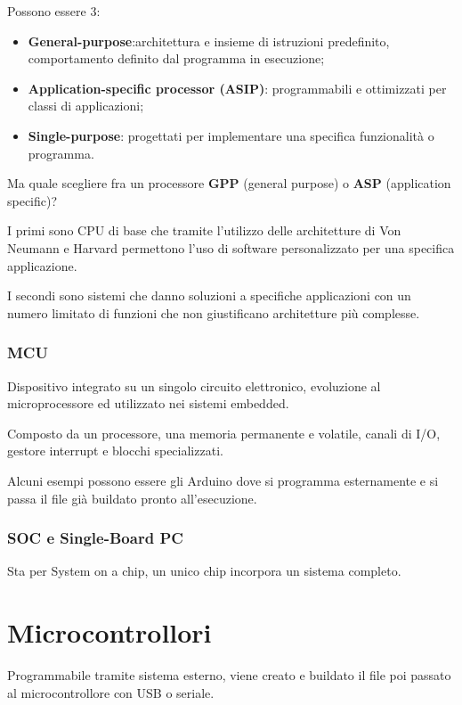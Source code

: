 Possono essere 3:

\begin{itemize}
\item
  \textbf{General-purpose}:architettura e insieme di istruzioni
  predefinito, comportamento definito dal programma in esecuzione;
\item
  \textbf{Application-specific processor (ASIP)}: programmabili e
  ottimizzati per classi di applicazioni;
\item
  \textbf{Single-purpose}: progettati per implementare una specifica
  funzionalità o programma.
\end{itemize}

Ma quale scegliere fra un processore \textbf{GPP} (general purpose) o
\textbf{ASP} (application specific)?

I primi sono CPU di base che tramite l'utilizzo delle architetture di
Von Neumann e Harvard permettono l'uso di software personalizzato per
una specifica applicazione.

I secondi sono sistemi che danno soluzioni a specifiche applicazioni con
un numero limitato di funzioni che non giustificano architetture più
complesse.

\subsubsection{MCU}\label{mcu}

Dispositivo integrato su un singolo circuito elettronico, evoluzione al
microprocessore ed utilizzato nei sistemi embedded.

Composto da un processore, una memoria permanente e volatile, canali di
I/O, gestore interrupt e blocchi specializzati.

Alcuni esempi possono essere gli Arduino dove si programma esternamente
e si passa il file già buildato pronto all'esecuzione.

\subsubsection{SOC e Single-Board PC}\label{soc-e-single-board-pc}

Sta per System on a chip, un unico chip incorpora un sistema completo.

\section{Microcontrollori}\label{microcontrollori}

Programmabile tramite sistema esterno, viene creato e buildato il file
poi passato al microcontrollore con USB o seriale.

